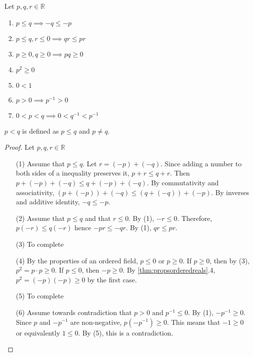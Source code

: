 \documentclass[../notes.tex]{subfiles}
\begin{document}
\begin{theorem}
	\label{thm:propsorderedreals}
	Let $p,q,r \in \mathbb{R}$
	\begin{enumerate}
		\item $p \leq q \implies -q \leq -p$
		\item $p \leq q, r \leq 0 \implies qr \leq pr$
		\item $p \geq 0, q\geq 0 \implies pq \geq 0$
		\item $p^2 \geq 0$
		\item $0 < 1$
		\item $p > 0 \implies p^{-1} > 0$
		\item $0 < p < q \implies 0 < q^{-1} < p^{-1}$
	\end{enumerate}

	\begin{remark}
		$p < q$ is defined as $p \leq q$ and $p \neq q$.
	\end{remark}
\end{theorem}

\begin{proof}
	Let $p,q,r \in \mathbb{R}$
	\begin{enumerate}
		\item[(1)]
			Assume that $p \leq q$. Let $r = (-p) + (-q)$. Since adding a number to both sides of a inequality preserves it, $p + r \leq q + r$. Then $p + (-p) + (-q) \leq q + (-p) + (-q)$. By commutativity and associativity, $(p + (-p)) + (-q) \leq (q + (-q)) + (-p)$. By inverses and additive identity, $-q \leq -p$.
		\item[(2)]
			Assume that $p \leq q$ and that $r \leq 0$. By (1), $-r \leq 0$. Therefore, $p(-r) \leq q(-r)$ hence $-pr \leq -qr$. By (1), $qr \leq pr$.
		\item[(3)] To complete
		\item[(4)]
			By the properties of an ordered field, $p \leq 0$ or $p \geq 0$. If $p \geq 0$, then by (3), $p^2 = p\cdot p \geq 0$. If $p \leq 0$, then $-p \geq 0$. By \ref{thm:propsorderedreals}.4, $p^2 = (-p)(-p) \geq 0$ by the first case.
		\item[(5)] To complete
		\item[(6)]
			Assume towards contradiction that $p > 0$ and $p^{-1} \leq 0$. By (1), $-p^{-1} \geq 0$. Since $p$ and $-p^{-1}$ are non-negative, $p (-p^{-1}) \geq 0$. This means that $-1 \geq 0$ or equivalently $1 \leq 0$. By (5), this is a contradiction.
	\end{enumerate}
\end{proof}
\end{document}
